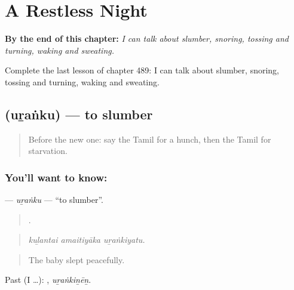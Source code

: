 
\chapter{A Restless Night}
\label{ch:ta-a-restless-night}

\begin{chapteropening}
\textbf{By the end of this chapter:} \emph{I can talk about slumber, snoring, tossing and turning, waking and sweating.}

Complete the last lesson of chapter 489: I can talk about slumber, snoring, tossing and turning, waking and sweating.
\end{chapteropening}

\section[\texorpdfstring{\ta{உறங்கு} (uṟaṅku)}{உறங்கு (uṟaṅku)}]{ (uṟaṅku) — to slumber}

\label{lesson:TA-C489-uranku}



\begin{quote}
Before the new one: say the Tamil for a hunch, then the Tamil for starvation.
\end{quote}

\subsection*{You'll want to know: }
\textbf{} — \emph{uṟaṅku} — \textquotedblleft{}to slumber\textquotedblright{}.

\begin{quote}
  .
\end{quote}

\begin{quote}
\emph{kuḻantai amaitiyāka uṟaṅkiyatu.}
\end{quote}

\begin{quote}
The baby slept peacefully.
\end{quote}

Past (I …): , \emph{uṟaṅkiṉēṉ}.

